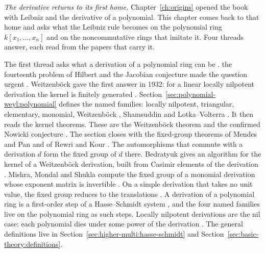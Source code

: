 \emph{The derivative returns to its first home.} Chapter~\ref{ch:origins}
opened the book with Leibniz and the derivative of a polynomial. This
chapter comes back to that home and asks what the Leibniz rule becomes on
the polynomial ring $k[x_{1},\dots,x_{n}]$ and on the noncommutative rings
that imitate it. Four threads answer, each read from the papers that carry
it.


The first thread asks what a derivation of a polynomial ring can be
\cite[p.~75]{Freudenburg2017}. the fourteenth problem of Hilbert and the
Jacobian conjecture made the question urgent
\cite[p.~xii]{Freudenburg2017}. Weitzenb\"ock gave the first answer in
1932: for a linear locally nilpotent derivation the kernel is finitely
generated \cite[p.~41]{DrenskyMakarLimanov2009}.
Section~\ref{sec:polynomial-weyl:polynomial} defines the named families:
locally nilpotent, triangular, elementary, monomial, Weitzenb\"ock
\cite[p.~76]{Freudenburg2017}, Shamsuddin \cite[p.~2033]{Baltazar2016} and
Lotka--Volterra \cite[p.~2]{RewriKour2025}. It then reads the kernel
theorems. These are the Weitzenb\"ock theorem and the confirmed Nowicki
conjecture \cite[Theorem~3, p.~44]{DrenskyMakarLimanov2009}. The section
closes with the fixed-group theorems of Mendes and Pan
\cite[Theorem~1, p.~2]{MendesPan2017} and of Rewri and Kour
\cite[Theorem~4.1, p.~20]{RewriKour2025}. The automorphisms that commute
with a derivation $d$ form the fixed group of $d$ there. Bedratyuk gives an
algorithm for the kernel of a Weitzenb\"ock derivation, built from Casimir
elements of the derivation \cite[p.~1]{Bedratyuk2005Casimir}.
Mishra, Mondal and Shukla compute the fixed group of a monomial derivation
whose exponent matrix is invertible \cite[Theorem~3.1,
p.~5]{MishraMondalShukla2026Monomial}. On a simple derivation that takes no
unit value, the fixed group reduces to the translations
\cite[Theorem~2.4, p.~5]{MishraMondalShukla2025Simple}. A derivation of a
polynomial ring is a first-order step of a Hasse--Schmidt system
\cite[\S 2, p.~217]{HasseSchmidt1937}, and the four named families live on the
polynomial ring as such steps. Locally
nilpotent derivations are the nil case: each polynomial dies under some
power of the derivation \cite[p.~3]{Freudenburg2017}. The general
definitions live in
Section~\ref{sec:higher-multi:hasse-schmidt} and
Section~\ref{sec:basic-theory:definitions}.

